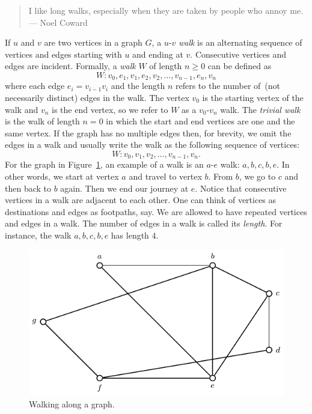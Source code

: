 \begin{quote}
\footnotesize
I like long walks, especially when they are taken by people who annoy
me. \\
\noindent
--- Noel Coward
\end{quote}

\noindent
If $u$ and $v$ are two vertices in a graph $G$, a $u$-$v$
\emph{walk} is an alternating sequence of vertices and
edges starting with $u$ and ending at $v$. Consecutive vertices and
edges are incident. Formally, a \emph{walk} $W$ of length
$n \geq 0$ can be defined as
\[
W: v_0, e_1, v_1, e_2, v_2, \dots, v_{n-1}, e_n, v_n
\]
where each edge $e_i = v_{i-1} v_i$ and the length
$n$ refers to the number of~(not necessarily distinct) edges in the
walk. The vertex $v_0$ is the starting vertex of the walk and $v_n$ is
the end vertex, so we refer to $W$ as a $v_0$-$v_n$ walk. The
\emph{trivial walk} is the walk of length $n = 0$
in which the start and end vertices are one and the same vertex. If
the graph has no multiple edges then, for brevity, we omit the edges
in a walk and usually write the walk as the following sequence of
vertices:
\[
W: v_0, v_1, v_2, \dots, v_{n-1}, v_n.
\]
For the graph in Figure~\ref{fig:introduction:types_of_walks}, an
example of a walk is an $a$-$e$ walk: $a, b, c, b, e$. In other words,
we start at vertex $a$ and travel to vertex $b$. From $b$, we go to
$c$ and then back to $b$ again. Then we end our journey at $e$. Notice
that consecutive vertices in a walk are adjacent to each other. One
can think of vertices as destinations and edges as footpaths, say. We
are allowed to have repeated vertices and edges in a walk. The number
of edges in a walk is called its \emph{length}. For
instance, the walk $a, b, c, b, e$ has length $4$.

\begin{figure}[!htbp]
\centering
\includegraphics{image/introduction/types-of-walks}
\caption{Walking along a graph.}
\label{fig:introduction:types_of_walks}
\end{figure}

